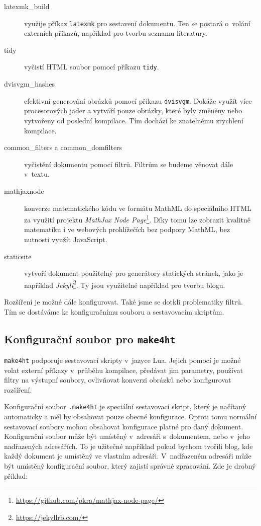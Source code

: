 \documentclass{csbulletin}
\newcommand\nazev[1]{\textit{#1}}
\newcommand\prikaz[1]{\texttt{#1}}
\begin{document}
\begin{description}
  \item[latexmk\_build] využije příkaz \prikaz{latexmk} pro sestavení
    dokumentu. Ten se postará o~volání externích příkazů, například pro tvorbu
    seznamu literatury.
  \item[tidy] vyčistí HTML soubor pomocí příkazu \prikaz{tidy}.
  \item[dvisvgm\_hashes] efektivní generování obrázků pomocí příkazu
    \prikaz{dvisvgm}. Dokáže využít více procesorových jader a vytváří pouze
    obrázky, které byly změněny nebo vytvořeny od poslední kompilace. Tím
    dochází ke znatelnému zrychlení kompilace.
  \item[common\_filters a common\_domfilters] vyčistění dokumentu pomocí filtrů. Filtrům se budeme věnovat dále v~textu.
  \item[mathjaxnode] konverze matematického kódu ve formátu MathML do
    speciálního HTML za využití projektu \nazev{MathJax Node
    Page}\footnote{\url{https://github.com/pkra/mathjax-node-page/}}. Díky tomu
    lze zobrazit kvalitně matematiku i ve webových prohlížečích bez podpory
    MathML, bez nutnosti využít JavaScript.
  \item[staticsite]  vytvoří dokument použitelný pro generátory statických
    stránek, jako je například
    \nazev{Jekyll}\footnote{\url{https://jekyllrb.com/}}. Ty jsou využitelné
    například pro tvorbu blogu.
\end{description}

Rozšíření je možné dále konfigurovat. Také jsme se dotkli problematiky filtrů.
Tím se dostáváme ke konfiguračnímu souboru a sestavovacím skriptům.

\subsection{Konfigurační soubor pro \prikaz{make4ht}}

\prikaz{make4ht} podporuje sestavovací skripty v~jazyce Lua. Jejich pomocí je
možné volat externí příkazy v~průběhu kompilace, předávat jim parametry,
používat filtry na výstupní soubory, ovlivňovat konverzi obrázků nebo
konfigurovat rozšíření.

Konfigurační soubor \texttt{.make4ht} je speciální sestavovací skript, který je
načítaný automaticky a měl by obsahovat pouze obecné konfigurace. Oproti tomu
normální sestavovací soubory mohou obsahovat konfigurace platné pro daný
dokument. Konfigurační soubor může být umístěný v~adresáři s~dokumentem, nebo
v~jeho nadřazených adresářích. To je užitečné například pokud bychom tvořili
blog, kde každý dokument je umístěný ve vlastním adresáři. V~nadřazeném
adresáři může být umístěný konfigurační soubor, který zajistí správné
zpracování. Zde je drobný příklad:
\end{document}
